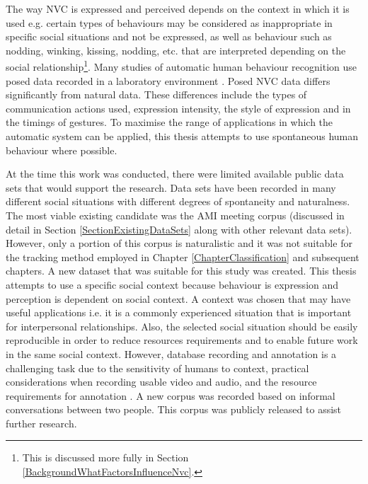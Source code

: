 The way \ac{NVC} is expressed and perceived depends on the context in which it is used e.g. certain types of behaviours may be considered as inappropriate in specific social situations and not be expressed, as well as behaviour such as nodding, winking, kissing, nodding, etc. that are interpreted depending on the social relationship\footnote{This is discussed more fully in Section \ref{BackgroundWhatFactorsInfluenceNvc}.}. Many studies of automatic human behaviour recognition use posed data recorded in a laboratory environment \cite{Pantic2009, GaticaPerez2009, Vinciarelli2008}. Posed \ac{NVC} data differs significantly from natural data. These differences include the types of communication actions used, expression intensity, the style of expression and in the timings of gestures. To maximise the range of applications in which the automatic system can be applied, this thesis attempts to use spontaneous human behaviour where possible.


At the time this work was conducted, there were limited available public data sets that would support the research. Data sets have been recorded in many different social situations with different degrees of spontaneity and naturalness. The most viable existing candidate was the AMI meeting corpus \cite{Carletta2007} (discussed in detail in Section \ref{SectionExistingDataSets} along with other relevant data sets). However, only a portion of this corpus is naturalistic and it was not suitable for the tracking method employed in Chapter \ref{ChapterClassification} and subsequent chapters. A new dataset that was suitable for this study was created. This thesis attempts to use a specific social context because behaviour is expression and perception is dependent on social context. A context was chosen that may have useful applications i.e. it is a commonly experienced situation that is important for interpersonal relationships. Also, the selected social situation should be easily reproducible in order to reduce resources requirements and to enable future work in the same social context. However, database recording and annotation is a challenging task due to the sensitivity of humans to context, practical considerations when recording usable video and audio, and the resource requirements for annotation \cite{Cowie2005}. A new corpus was recorded based on informal conversations between two people. This corpus was publicly released to assist further research.

